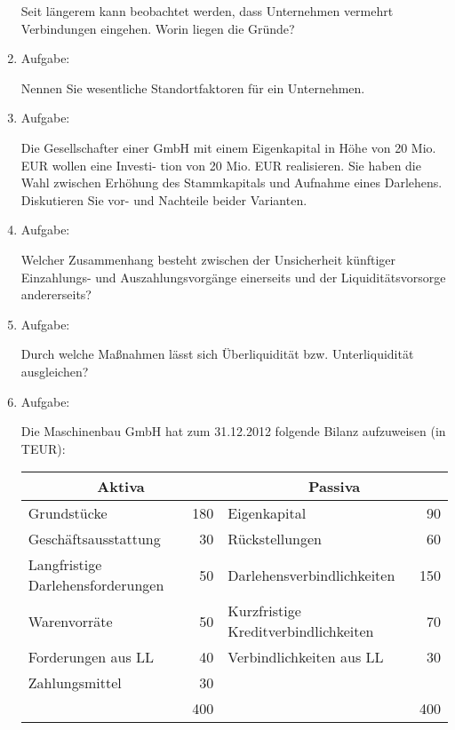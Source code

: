 \documentclass[12pt,a4paper]{scrreprt}
\begin{document}
\begin{enumerate}
Seit längerem kann beobachtet werden, dass Unternehmen vermehrt Verbindungen eingehen. Worin
liegen die Gründe?

 	\item{Aufgabe:}

Nennen Sie wesentliche Standortfaktoren für ein Unternehmen.

 	\item{Aufgabe:}

Die Gesellschafter einer GmbH mit einem Eigenkapital in Höhe von 20 Mio. EUR wollen eine Investi-
tion von 20 Mio. EUR realisieren. Sie haben die Wahl zwischen Erhöhung des Stammkapitals und
Aufnahme eines Darlehens. Diskutieren Sie vor- und Nachteile beider Varianten.

 	\item{Aufgabe:}

Welcher Zusammenhang besteht zwischen der Unsicherheit künftiger Einzahlungs-
und Auszahlungsvorgänge einerseits und der Liquiditätsvorsorge andererseits?

 	\item{Aufgabe:}

Durch welche Maßnahmen lässt sich Überliquidität bzw. Unterliquidität ausgleichen?

 	\item{Aufgabe:}

Die Maschinenbau GmbH hat zum 31.12.2012 folgende Bilanz aufzuweisen (in TEUR):

\begin{tabular}{|lr|lr|}
\hline \multicolumn{2}{|c|}{Aktiva} & \multicolumn{2}{|c|}{Passiva} \\\hline
Grundstücke & 180 & Eigenkapital & 90 \\\hline
Geschäftsausstattung & 30 & Rückstellungen & 60 \\\hline
Langfristige Darlehensforderungen & 50 & Darlehensverbindlichkeiten & 150 \\\hline
Warenvorräte & 50 & Kurzfristige Kreditverbindlichkeiten & 70 \\\hline
Forderungen aus LL & 40 & Verbindlichkeiten aus LL & 30 \\\hline
Zahlungsmittel & 30 &  \multicolumn{2}{|l|}{} \\\hline
 \multicolumn{2}{|r|}{400} & \multicolumn{2}{|r|}{400} \\\hline
\end{tabular}

\end{enumerate}
\end{document}
